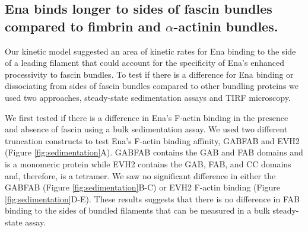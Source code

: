 \subsection{Ena binds longer to sides of fascin bundles compared to fimbrin and \texorpdfstring{$\alpha$}{a}-actinin bundles.}

Our kinetic model suggested an area of kinetic rates for Ena binding to the side of a leading filament that could account for the specificity of Ena's enhanced processivity to fascin bundles. To test if there is a difference for Ena binding or dissociating from sides of fascin bundles compared to other bundling proteins we used two approaches, steady-state sedimentation assays and TIRF microscopy.

We first tested if there is a difference in Ena's F-actin binding in the presence and absence of fascin using a bulk sedimentation assay. We used two different truncation constructs to test Ena's F-actin binding affinity, GABFAB and EVH2 (Figure \ref{fig:sedimentation}A). GABFAB contains the GAB and FAB domains and is a monomeric protein while EVH2 contains the GAB, FAB, and CC domains and, therefore, is a tetramer. We saw no significant difference in either the GABFAB (Figure \ref{fig:sedimentation}B-C) or EVH2 F-actin binding (Figure \ref{fig:sedimentation}D-E). These results suggests that there is no difference in FAB binding to the sides of bundled filaments that can be measured in a bulk steady-state assay. 

